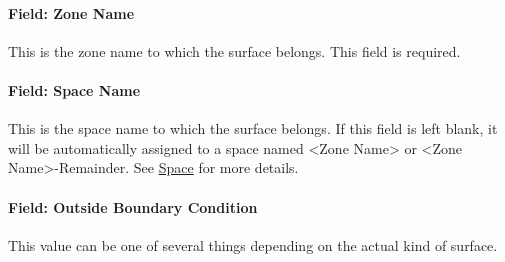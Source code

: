 \paragraph{Field: Zone Name}\label{field-zone-name-12-000}

This is the zone name to which the surface belongs. This field is required.

\paragraph{Field: Space Name}\label{field-space-name-12-000}

This is the space name to which the surface belongs. If this field is left blank, it will be automatically assigned to a space named <Zone Name> or <Zone Name>-Remainder. See \hyperref[space]{Space} for more details.

\paragraph{Field: Outside Boundary Condition}\label{field-outside-boundary-condition-2}

This value can be one of several things depending on the actual kind of surface.

